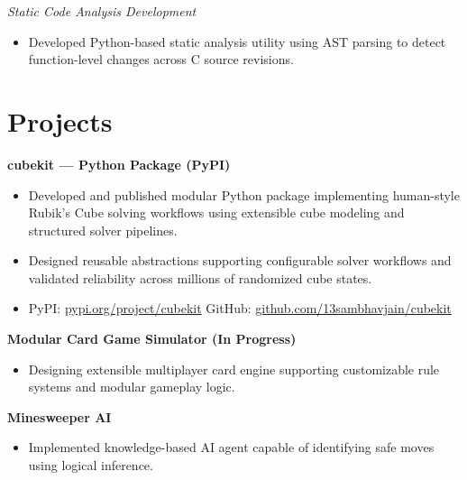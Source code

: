 \documentclass[a4paper,10pt]{article}
\begin{document}
\textit{Static Code Analysis Development}

\begin{itemize}

\item Developed Python-based static analysis utility using AST parsing to detect function-level changes across C source revisions.

\end{itemize}

\section*{Projects}

\noindent
\textbf{cubekit — Python Package (PyPI)}

\begin{itemize}

\item Developed and published modular Python package implementing human-style Rubik's Cube solving workflows using extensible cube modeling and structured solver pipelines.

\item Designed reusable abstractions supporting configurable solver workflows and validated reliability across millions of randomized cube states.

\item PyPI: \href{https://pypi.org/project/cubekit/}{pypi.org/project/cubekit} \quad GitHub: \href{https://github.com/13sambhavjain/cubekit}{github.com/13sambhavjain/cubekit}

\end{itemize}

\vspace{2pt}

\noindent
\textbf{Modular Card Game Simulator (In Progress)}

\begin{itemize}

\item Designing extensible multiplayer card engine supporting customizable rule systems and modular gameplay logic.

\end{itemize}

\vspace{2pt}

\noindent
\textbf{Minesweeper AI}

\begin{itemize}

\item Implemented knowledge-based AI agent capable of identifying safe moves using logical inference.

\end{itemize}
\end{document}
